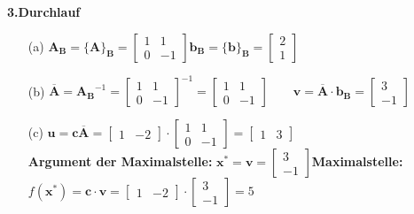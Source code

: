 \vspace{0.5cm}
\textbf{3.Durchlauf}
\begin{itemize}
	\item[(a)] $\mathbf{A_B}=\{\mathbf{A}\}_{\mathbf{B}}=\begin{bmatrix}1&1\\0&-1\end{bmatrix}$\qquad $\mathbf{b}_\mathbf{B}=\{\mathbf{b}\}_{\mathbf{B}}=\begin{bmatrix}2\\1\end{bmatrix}$
	\item[(b)] $\overline{\mathbf{A}}=\mathbf{A_B}^{-1}=\begin{bmatrix}1&1\\0&-1\end{bmatrix}^{-1}=\begin{bmatrix}1&1\\0&-1\end{bmatrix}\qquad
	\mathbf{v}=\mathbf{\overline{A}}\cdot\mathbf{b_B}=\begin{bmatrix}3\\-1\end{bmatrix}$
	\item[(c)] $\mathbf{u}=\mathbf{c\overline{A}}=\begin{bmatrix}1&-2\end{bmatrix}\cdot\begin{bmatrix}1&1\\0&-1\end{bmatrix}=\begin{bmatrix}1&3\end{bmatrix}$\\
	\textbf{Argument der Maximalstelle:} $\mathbf{x^*}=\mathbf{v}=\begin{bmatrix}3\\-1\end{bmatrix}$\qquad \textbf{Maximalstelle:} $f(\mathbf{x^*})=\mathbf{c}\cdot\mathbf{v}=\begin{bmatrix}1&-2\end{bmatrix}\cdot \begin{bmatrix}3\\-1\end{bmatrix}=5$
\end{itemize}

\vfill






